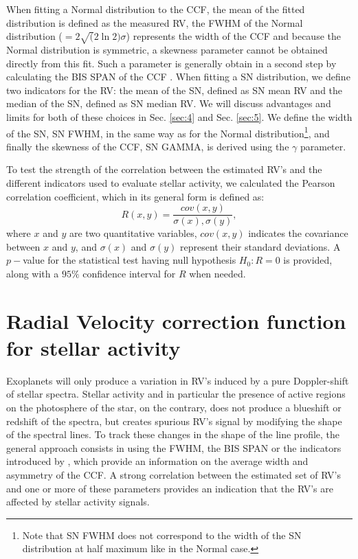 \documentclass[11pt, oneside]{article}
\begin{document}
When fitting a Normal distribution to the CCF, the mean of the fitted distribution is defined as the measured RV, the FWHM of the Normal distribution ($=2\sqrt(2\ln2)\sigma$) represents the width of the CCF and because the Normal distribution is symmetric, a  skewness parameter cannot be obtained directly from this fit. Such a parameter is generally obtain in a second step by calculating the BIS SPAN of the CCF \citep[see Sect. \ref{intro}, and e.g.][]{Queloz-2001}. When fitting a SN distribution, we define two indicators for the RV: the mean of the SN, defined as SN mean RV and the median of the SN, defined as SN median RV. We will discuss advantages and limits for both of these choices in Sec. \ref{sec:4} and Sec. \ref{sec:5}. We define the width of the SN, SN FWHM, in the same way as for the Normal distribution\footnote{Note that SN FWHM does not correspond to the width of the SN distribution at half maximum like in the Normal case.}, and finally the skewness of the CCF, SN GAMMA, is derived using the $\gamma$ parameter.

To test the strength of the correlation between the estimated RV's and the different indicators used to evaluate stellar activity, we calculated the Pearson correlation coefficient, which in its general form is defined as:
%
\begin{equation}
R (x,y)= \frac{cov(x,y)}{\sigma(x),\sigma(y)},
\label{eq:Pearson:corr}
\end{equation}
%
where $x$ and $y$ are two quantitative variables, $cov(x,y)$ indicates the covariance between $x$ and $y$, and $\sigma(x)$ and $\sigma(y)$ represent their standard deviations.  A $p-$value for the statistical test having null hypothesis $H_{0}: R=0$ is provided, along with a $95\%$ confidence interval for $R$ when needed.

\section{Radial Velocity correction function for stellar activity} \label{sec:31}

Exoplanets will only produce a variation in RV's induced by a pure Doppler-shift of stellar spectra. Stellar activity and in particular the presence of active regions on the photosphere of the star, on the contrary, does not produce a blueshift or redshift of the spectra, but creates spurious RV's signal by modifying the shape of the spectral lines. To track these changes in the shape of the line profile, the general approach consists in using the FWHM, the BIS SPAN or the indicators introduced by \citep{Figueira-2013}, which provide an information on the average width and asymmetry of the CCF. A strong correlation between the estimated set of RV's and one or more of these parameters provides an indication that the RV's are affected by stellar activity signals.
\end{document}
